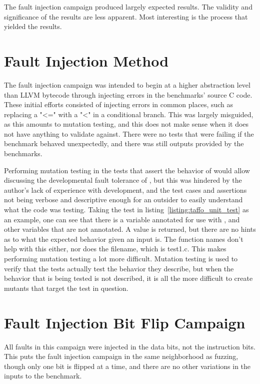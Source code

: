


The fault injection campaign produced largely expected results. The validity and significance of the results are less apparent. Most interesting is the process that yielded the results.


\section{Fault Injection Method}

The fault injection campaign was intended to begin at a higher abstraction level than LLVM bytecode through injecting errors in the benchmarks' source C code. These initial efforts consisted of injecting errors in common places, such as replacing a "<=" with a "<" in a conditional branch. This was largely misguided, as this amounts to mutation testing, and this does not make sense when it does not have anything to validate against. There were no tests that were failing if the benchmark behaved unexpectedly, and there was still outputs provided by the benchmarks. 

Performing mutation testing in the tests that assert the behavior of \taffo{} would allow discussing the developmental fault tolerance of \taffo{}, but this was hindered by the author's lack of experience with \taffo{} development, and the test cases and assertions not being verbose and descriptive enough for an outsider to easily understand what the code was testing. Taking the test in listing~\ref{listing:taffo_unit_test} as an example, one can see that there is a variable annotated for use with \taffo{},  and other variables that are not annotated. A value is returned, but there are no hints as to what the expected behavior given an input is. The function names don't help with this either, nor does the filename, which is test1.c. This makes performing mutation testing a lot more difficult. Mutation testing is used to verify that the tests actually test the behavior they describe, but when the behavior that is being tested is not described, it is all the more difficult to create mutants that target the test in question.

\section{Fault Injection Bit Flip Campaign}

All faults in this campaign were injected in the data bits, not the instruction bits. This puts the fault injection campaign in the same neighborhood as fuzzing, though only one bit is flipped at a time, and there are no other variations in the inputs to the benchmark.

